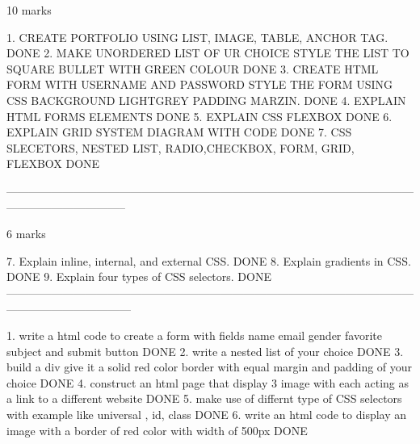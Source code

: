 
10 marks


1.      CREATE PORTFOLIO USING LIST, IMAGE, TABLE, ANCHOR TAG.                                                                      DONE        
2.	    MAKE UNORDERED LIST OF UR CHOICE STYLE THE LIST TO SQUARE BULLET WITH GREEN COLOUR                                          DONE 
3.	    CREATE HTML FORM WITH USERNAME AND PASSWORD STYLE THE FORM USING CSS BACKGROUND LIGHTGREY PADDING MARZIN.                   DONE 
4.	    EXPLAIN HTML FORMS ELEMENTS                                                                                                 DONE                                 
5.	    EXPLAIN CSS FLEXBOX                                                                                                         DONE
6.	    EXPLAIN GRID SYSTEM DIAGRAM WITH CODE                                                                                       DONE
7.	    CSS SLECETORS, NESTED LIST, RADIO,CHECKBOX, FORM, GRID, FLEXBOX                                                             DONE             

--------------------------------------------------------------------------------------------------------------------------------------------

6 marks

7.      Explain inline, internal, and external CSS.                                                                                DONE
8.      Explain gradients in CSS.                                                                                                  DONE       
9.      Explain four types of CSS selectors.                                                                                       DONE                                                                                                                                                                                                   
---------------------------------------------------------------------------------------------------------------------------------------------


1.         write a html code to create a form with fields name email gender  favorite subject and submit button                     DONE 
2.         write a nested list of your choice                                                                                       DONE                                                                      
3.         build a div give it a solid red color border with equal margin and padding of your choice                                DONE      
4.         construct an html page that display  3 image with each acting as a link to a different website                           DONE        
5.         make use of differnt type of CSS selectors with example like universal , id, class                                       DONE              
6.         write an html code to display an image with a border of red color with width of 500px                                    DONE 

